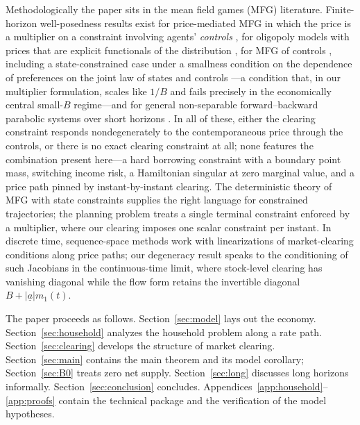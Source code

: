 \documentclass[11pt]{article}
\theoremstyle{definition}
\theoremstyle{remark}
\newcommand{\ubar}[1]{\underline{#1}}
\newcommand{\uba}{\ubar{a}}
\begin{document}
Methodologically the paper sits in the mean field games (MFG)
literature. Finite-horizon well-posedness results exist for
price-mediated MFG in which the price is a multiplier on a constraint
involving agents' \emph{controls}
\citep{GomesSaude2021,FujiiTakahashi2022}, for oligopoly models with
prices that are explicit functionals of the distribution
\citep{GraberBensoussan2018}, for MFG of controls
\citep{CardaliaguetLehalle2018,Kobeissi2022}, including a
state-constrained case under a smallness condition on the dependence
of preferences on the joint law of states and controls
\citep{GraberMayorga2021}---a condition that, in our multiplier
formulation, scales like $1/B$ and fails precisely in the
economically central small-$B$ regime---and for general non-separable
forward--backward parabolic systems over short horizons
\citep{CirantGianniMannucci2020}. In all of these, either the
clearing constraint responds nondegenerately to the contemporaneous
price through the controls, or there is no exact clearing constraint
at all; none features the combination present here---a hard borrowing
constraint with a boundary point mass, switching income risk, a
Hamiltonian singular at zero marginal value, and a price path pinned
by instant-by-instant clearing. The deterministic theory of MFG with
state constraints \citep{CannarsaCapuani2018,CCC2021} supplies the
right language for constrained trajectories; the planning problem
\citep{Porretta2014} treats a single terminal constraint enforced by a
multiplier, where our clearing imposes one scalar constraint per
instant. In discrete time, sequence-space methods
\citep{AuclertEtAl2021} work with linearizations of market-clearing
conditions along price paths; our degeneracy result speaks to the
conditioning of such Jacobians in the continuous-time limit, where
stock-level clearing has vanishing diagonal while the flow form
retains the invertible diagonal $B+|\uba|m_1(t)$.

The paper proceeds as follows. Section~\ref{sec:model} lays out the
economy. Section~\ref{sec:household} analyzes the household problem
along a rate path. Section~\ref{sec:clearing} develops the structure
of market clearing. Section~\ref{sec:main} contains the main theorem
and its model corollary; Section~\ref{sec:B0} treats zero net supply.
Section~\ref{sec:long} discusses long horizons informally.
Section~\ref{sec:conclusion} concludes.
Appendices~\ref{app:household}--\ref{app:proofs} contain the
technical package and the verification of the model hypotheses.

\end{document}
